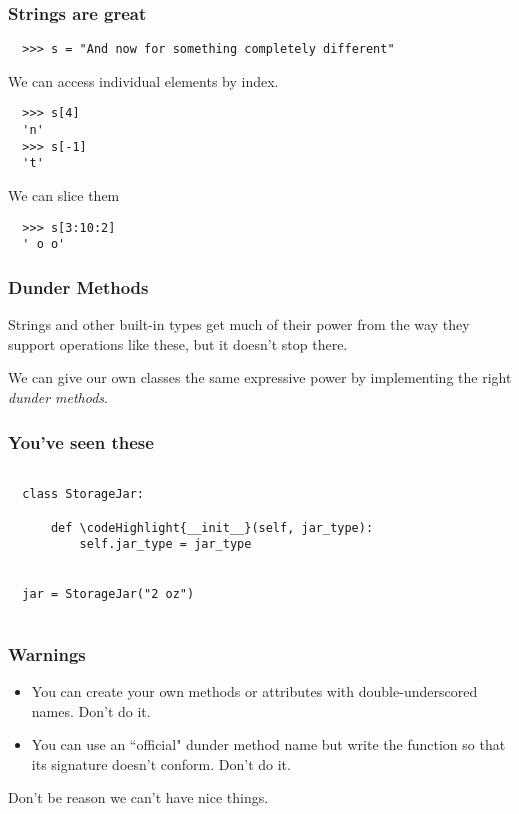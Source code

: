 \documentclass[aspectratio=169]{beamer}
\newcommand\codeHighlight[1]{\textcolor[rgb]{1,0,0}{\textbf{#1}}}
\begin{document}
\begin{frame}[fragile]
  \frametitle{Strings are great}
  
  \begin{verbatim}
  >>> s = "And now for something completely different"
  \end{verbatim}  
  We can access individual elements by index.
  \begin{verbatim}
  >>> s[4]
  'n'
  >>> s[-1]
  't'
  \end{verbatim}  
  We can slice them
  \begin{verbatim}
  >>> s[3:10:2]
  ' o o'
  \end{verbatim}
  
  \end{frame}

\begin{frame}
  \frametitle{Dunder Methods}
  
  Strings and other built-in types get much of their power from the way
  they support operations like these, but it doesn't stop there.
  
  \bigbreak
  
  We can give our own classes the same expressive power by implementing the right
  \emph{dunder methods}.
  \end{frame}
  
\begin{frame}[fragile]
  \frametitle{You've seen these}
  
  \begin{Verbatim}[commandchars=\\\{\}]
  
  class StorageJar:
      
      def \codeHighlight{__init__}(self, jar_type):
          self.jar_type = jar_type
          
  
  jar = StorageJar("2 oz")         
  
  \end{Verbatim}
  \end{frame}
  
\begin{frame}
  \frametitle{Warnings}
  
  \begin{itemize}
    \item You can create your own methods or attributes with double-underscored names. Don't do it.
    \item You can use an ``official" dunder method name but write the function so that its signature doesn't conform. Don't do it.
  \end{itemize}  
  
  Don't be reason we can't have nice things.
  \end{frame}
  
\end{document}
